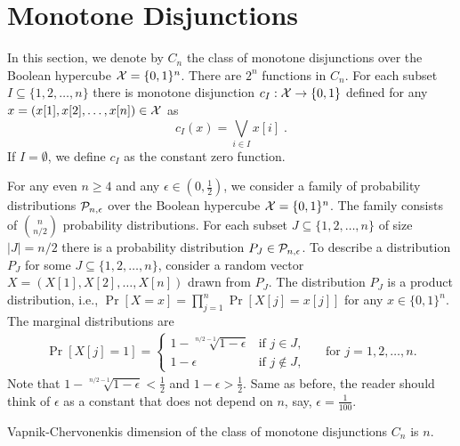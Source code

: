 \section{Monotone Disjunctions}
\label{section:monotone-dijsunctions}

In this section, we denote by $C_n$ the class of monotone disjunctions over the
Boolean hypercube $\X = \{0,1\}^n$. There are $2^n$ functions in $C_n$. For each
subset $I \subseteq \{1,2,\dots,n\}$ there is monotone disjunction $c_I:\X \to
\{0,1\}$ defined for any $x = (x[1],
x[2], \dots, x[n]) \in \X$ as
$$
c_I(x) = \bigvee_{i \in I} x[i] \; .
$$
If $I = \emptyset$, we define $c_I$ as the constant zero function.

For any even $n \ge 4$ and any $\epsilon \in (0,\frac{1}{2})$, we consider a
family of probability distributions $\P_{n,\epsilon}$ over the Boolean hypercube $\X =
\{0,1\}^n$. The family consists of $\binom{n}{n/2}$ probability distributions.
For each subset $J \subseteq \{1,2,\dots,n\}$ of size $|J| = n/2$
there is a probability distribution $P_J \in \P_{n,\epsilon}$. To describe a distribution $P_J$
for some $J \subseteq \{1,2,\dots,n\}$, consider a random vector $X = (X[1],
X[2], \dots, X[n])$ drawn from $P_J$. The distribution $P_J$ is a product
distribution, i.e., $\Pr[X=x] = \prod_{j=1}^n \Pr[X[j] = x[j]]$ for any $x \in
\{0,1\}^n$. The marginal distributions are
\begin{align*}
\Pr[X[j] = 1] =
\begin{cases}
1 - \sqrt[n/2 - 1]{1 - \epsilon}  & \text{if $j \in J$,} \\
1 - \epsilon & \text{if $j \not \in J$,}
\end{cases}
&& \text{for $j=1,2,\dots,n$.}
\end{align*}
Note that $1 - \sqrt[n/2-1]{1 - \epsilon} < \frac{1}{2}$ and $1 - \epsilon >
\frac{1}{2}$. Same as before, the reader should think of $\epsilon$ as a
constant that does not depend on $n$, say, $\epsilon=\frac{1}{100}$.

\begin{proposition}
Vapnik-Chervonenkis dimension of the class of monotone disjunctions $C_n$ is $n$.
\end{proposition}

